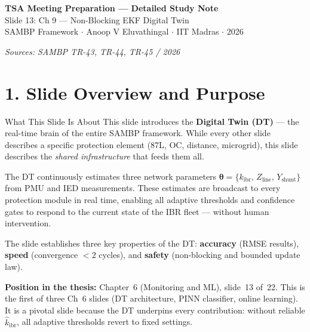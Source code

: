 \documentclass[12pt,a4paper]{article}
\begin{document}
\begin{tcolorbox}[colback=iitmnavy,coltext=white,arc=4pt,boxrule=0pt]
\begin{center}
{\Large\bfseries TSA Meeting Preparation --- Detailed Study Note}\\[6pt]
{\large Slide 13: Ch 9 --- Non-Blocking EKF Digital Twin}\\[4pt]
{\normalsize SAMBP Framework $\cdot$ Anoop V Eluvathingal $\cdot$ IIT Madras $\cdot$ 2026}
\end{center}
\end{tcolorbox}

\vspace{0.5em}
\begin{center}
\small\textit{Sources: SAMBP TR-43, TR-44, TR-45 / 2026}
\end{center}

\section{1.\; Slide Overview and Purpose}

\begin{keybox}{What This Slide Is About}
This slide introduces the \textbf{Digital Twin (DT)} — the real-time brain of the
entire SAMBP framework. While every other slide describes a specific protection
element (87L, OC, distance, microgrid), this slide describes the \emph{shared
infrastructure} that feeds them all.

The DT continuously estimates three network parameters
$\boldsymbol{\theta} = \{k_\mathrm{ibr},\, Z_\mathrm{line},\, Y_\mathrm{shunt}\}$
from PMU and IED measurements. These estimates are broadcast to every protection
module in real time, enabling all adaptive thresholds and confidence gates to
respond to the current state of the IBR fleet — without human intervention.

The slide establishes three key properties of the DT: \textbf{accuracy} (RMSE
results), \textbf{speed} (convergence $<2$ cycles), and \textbf{safety}
(non-blocking and bounded update law).
\end{keybox}

\noindent\textbf{Position in the thesis:} Chapter~6 (Monitoring and ML), slide~13
of~22. This is the first of three Ch~6 slides (DT architecture, PINN classifier,
online learning). It is a pivotal slide because the DT underpins every contribution:
without reliable $\hat{k}_\mathrm{ibr}$, all adaptive thresholds revert to fixed settings.
\end{document}
